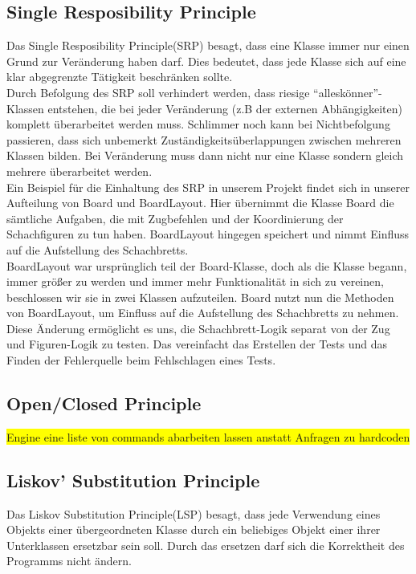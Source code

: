 \documentclass[
10pt, %
a4paper, %
oneside, %
headinclude,footinclude, %
BCOR5mm, %
]{scrartcl}
\begin{document}
\subsection{Single Resposibility Principle}
Das Single Resposibility Principle(SRP) besagt, dass eine Klasse immer nur einen Grund zur Veränderung haben darf. Dies bedeutet, dass jede Klasse sich auf eine klar abgegrenzte Tätigkeit beschränken sollte. 
\\
Durch Befolgung des SRP soll verhindert werden, dass riesige \enquote{alleskönner}-Klassen entstehen, die bei jeder Veränderung (z.B der externen Abhängigkeiten) komplett überarbeitet werden muss. Schlimmer noch kann bei Nichtbefolgung passieren, dass sich unbemerkt Zuständigkeitsüberlappungen zwischen mehreren Klassen bilden. Bei Veränderung muss dann nicht nur eine Klasse sondern gleich mehrere überarbeitet werden.
\\
Ein Beispiel für die Einhaltung des SRP in unserem Projekt findet sich in unserer Aufteilung von Board und BoardLayout. Hier übernimmt die Klasse Board die sämtliche Aufgaben, die mit Zugbefehlen und der Koordinierung der Schachfiguren zu tun haben. BoardLayout hingegen speichert und nimmt Einfluss auf die Aufstellung des Schachbretts.
\\
BoardLayout war ursprünglich teil der Board-Klasse, doch als die Klasse begann, immer größer zu werden und immer mehr Funktionalität in sich zu vereinen, beschlossen wir sie in zwei Klassen aufzuteilen.
Board nutzt nun die Methoden von BoardLayout, um Einfluss auf die Aufstellung des Schachbretts zu nehmen.
\\
Diese Änderung ermöglicht es uns, die Schachbrett-Logik separat von der Zug und Figuren-Logik zu testen. Das vereinfacht das Erstellen der Tests und das Finden der Fehlerquelle beim Fehlschlagen eines Tests.
\subsection{Open/Closed Principle}
\colorbox{yellow}{Engine eine liste von commands abarbeiten lassen anstatt Anfragen zu hardcoden}
\subsection{Liskov' Substitution Principle}
Das Liskov Substitution Principle(LSP) besagt, dass jede Verwendung eines Objekts einer übergeordneten Klasse durch ein beliebiges Objekt einer ihrer Unterklassen ersetzbar sein soll. Durch das ersetzen darf sich die Korrektheit des Programms nicht ändern.
\end{document}
